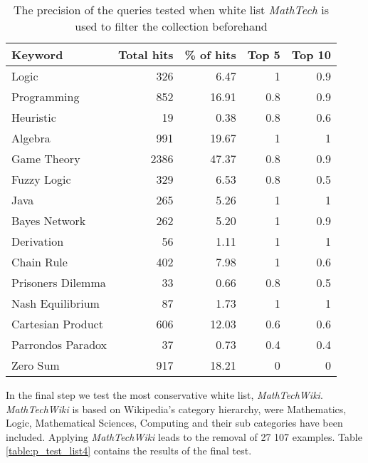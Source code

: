 \begin{table}[h]
\centering
\small
\begin{tabular} {|| p{10em} | r | r | r | r ||} 
 \hline
 Keyword & Total hits & \% of hits & Top 5 & Top 10 \\ [0.5ex] 
 \hline

Logic & 326 & 6.47 & 1 & 0.9 \\
Programming & 852 & 16.91 & 0.8 & 0.9 \\
Heuristic & 19 & 0.38 & 0.8 & 0.6 \\
Algebra & 991 & 19.67 & 1 & 1 \\
Game Theory & 2386 & 47.37 & 0.8 & 0.9 \\
\hline
Fuzzy Logic & 329 & 6.53 & 0.8 & 0.5 \\
Java & 265 & 5.26 & 1 & 1 \\
Bayes Network & 262 & 5.20 & 1 & 0.9 \\
Derivation & 56 & 1.11 & 1 & 1 \\
\hline
Chain Rule & 402 & 7.98 & 1 & 0.6 \\
Prisoners Dilemma & 33 & 0.66 & 0.8 & 0.5 \\
Nash Equilibrium & 87 & 1.73 & 1 & 1 \\
Cartesian Product & 606 & 12.03 & 0.6 & 0.6 \\
Parrondos Paradox & 37 & 0.73 & 0.4 & 0.4 \\
Zero Sum & 917 & 18.21 & 0 & 0 \\

 \hline
\end{tabular}
\caption{The precision of the queries tested when white list \textit{MathTech} is used to filter the collection beforehand}
\label{table:p_test_list3}
\end{table}
\clearpage

In the final step we test the most conservative white list, \textit{MathTechWiki}. \textit{MathTechWiki} is based on Wikipedia's category hierarchy, were Mathematics, Logic, Mathematical Sciences, Computing and their sub categories have been included. Applying \textit{MathTechWiki} leads to the removal of 27 107 examples. Table \ref{table:p_test_list4} contains the results of the final test. 

